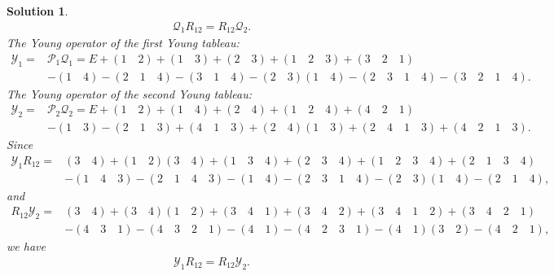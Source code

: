 \documentclass[UTF8,10pt,a4paper]{article}
\theoremstyle{Problem}
\theoremstyle{Solution}
\newtheorem*{sol}{Solution}
\begin{document}
\begin{sol}
\begin{align}
        \mathcal{Q}_1R_{12}=R_{12}\mathcal{Q}_2.
    \end{align}
    The Young operator of the first Young tableau:
    \begin{align}
        \nonumber\mathcal{Y}_1=&\mathcal{P}_1\mathcal{Q}_1=E+(1\quad 2)+(1\quad 3)+(2\quad 3)+(1\quad 2\quad 3)+(3\quad 2\quad 1)\\
        &-(1\quad 4)-(2\quad 1\quad 4)-(3\quad 1\quad 4)-(2\quad 3)(1\quad 4)-(2\quad 3\quad 1\quad 4)-(3\quad 2\quad 1\quad 4).
    \end{align}
    The Young operator of the second Young tableau:
    \begin{align}
        \nonumber\mathcal{Y}_2=&\mathcal{P}_2\mathcal{Q}_2=E+(1\quad 2)+(1\quad 4)+(2\quad 4)+(1\quad 2\quad 4)+(4\quad 2\quad 1)\\
        &-(1\quad 3)-(2\quad 1\quad 3)+(4\quad 1\quad 3)+(2\quad 4)(1\quad 3)+(2\quad 4\quad 1\quad 3)+(4\quad 2\quad 1\quad 3).
    \end{align}
    Since
    \begin{align}
        \mathcal{Y}_1R_{12}=&(3\quad 4)+(1\quad 2)(3\quad 4)+(1\quad 3\quad 4)+(2\quad 3\quad 4)+(1\quad 2\quad 3\quad 4)+(2\quad 1\quad 3\quad 4)\\
        &-(1\quad 4\quad 3)-(2\quad 1\quad 4\quad 3)-(1\quad 4)-(2\quad 3\quad 1\quad 4)-(2\quad 3)(1\quad 4)-(2\quad 1\quad 4),
    \end{align}
    and
    \begin{align}
        R_{12}\mathcal{Y}_2=&(3\quad 4)+(3\quad 4)(1\quad 2)+(3\quad 4\quad 1)+(3\quad 4\quad 2)+(3\quad 4\quad 1\quad 2)+(3\quad 4\quad 2\quad 1)\\
        &-(4\quad 3\quad 1)-(4\quad 3\quad 2\quad 1)-(4\quad 1)-(4\quad 2\quad 3\quad 1)-(4\quad 1)(3\quad 2)-(4\quad 2\quad 1),
    \end{align}
    we have
    \begin{align}
        \mathcal{Y}_1R_{12}=R_{12}\mathcal{Y}_2.
    \end{align}
\end{sol}
\end{document}
